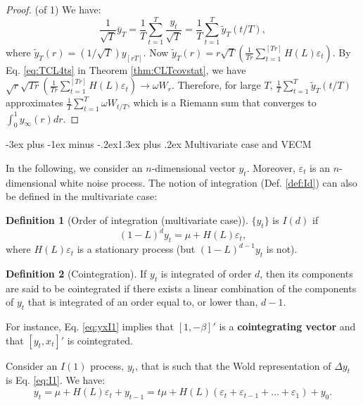 \documentclass[
  11pt,
]{book}
\makeatletter
\renewcommand\section{\@startsection{section}{1}{\z@}
  {-3ex plus -1ex minus -.2ex}{1.3ex plus .2ex}
  {\normalfont\Large\bfseries\color{TextbookInk}}}
\theoremstyle{definition}
\newtheorem{definition}{Definition}[chapter]
\theoremstyle{definition}
\theoremstyle{definition}
\theoremstyle{definition}
\theoremstyle{remark}
\makeatother
\begin{document}
\begin{proof}
(of 1)
We have:
\[
\dfrac{1}{\sqrt{T}}\bar{y}_T = \frac{1}{T}\sum_{t=1}^{T}\frac{y_{t}}{\sqrt{T}} =  \frac{1}{T}\sum_{t=1}^{T}\tilde{y}_T(t/T),
\]
where \(\tilde{y}_T(r)=(1/\sqrt{T})y_{[rT]}\). Now \(\tilde{y}_T(r) = r \sqrt{T} \left(\frac{1}{Tr}\sum_{t=1}^{[Tr]} H(L)\varepsilon_t\right)\). By Eq. \eqref{eq:TCL4ts} in Theorem \ref{thm:CLTcovstat}, we have \(\sqrt{r}\sqrt{Tr} \left(\frac{1}{Tr}\sum_{t=1}^{[Tr]} H(L)\varepsilon_t\right) \rightarrow \omega W_r\). Therefore, for large \(T\), \(\frac{1}{T}\sum_{t=1}^{T}\tilde{y}_T(t/T)\) approximates \(\frac{1}{T}\sum_{t=1}^{T} \omega W_{t/T}\), which is a Riemann sum that converges to \(\int_{0}^{1}y_{\infty}(r)dr\).
\end{proof}

\section{Multivariate case and VECM}\label{multivariate-case-and-vecm}

In the following, we consider an \(n\)-dimensional vector \(y_t\). Moreover, \(\varepsilon_t\) is an \(n\)-dimensional white noise process. The notion of integration (Def. \ref{def:Id}) can also be defined in the multivariate case:

\begin{definition}[Order of integration (multivariate case)]
\protect\hypertarget{def:Idmultivar}{}\label{def:Idmultivar}\(\{y_t\}\) is \(I(d)\) if
\begin{equation}
(1-L)^dy_t = \mu + H(L)\varepsilon_t,\label{eq:I1}
\end{equation}
where \(H(L)\varepsilon_t\) is a stationary process (but \((1-L)^{d-1}y_t\) is not).
\end{definition}

\begin{definition}[Cointegration]
\protect\hypertarget{def:cointegration}{}\label{def:cointegration}If \(y_t\) is integrated of order \(d\), then its components are said to be cointegrated if there exists a linear combination of the components of \(y_t\) that is integrated of an order equal to, or lower than, \(d-1\).
\end{definition}

For instance, Eq. \eqref{eq:yxI1} implies that \([1,-\beta]'\) is a \textbf{cointegrating vector} and that \([y_t,x_t]'\) is cointegrated.

Consider an \(I(1)\) process, \(y_t\), that is such that the Wold representation of \(\Delta y_t\) is Eq. \eqref{eq:I1}. We have:
\[
y_t = \mu + H(L)\varepsilon_t + y_{t-1} = t \mu + H(L)(\varepsilon_t + \varepsilon_{t-1} + \dots + \varepsilon_1) + y_0.
\]
\end{document}
